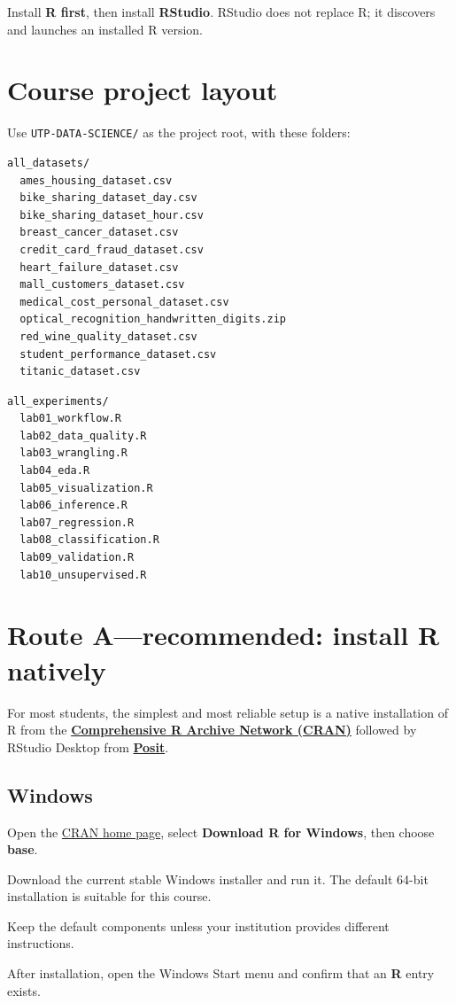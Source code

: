 \begin{keyidea}
Install \textbf{R first}, then install \textbf{RStudio}. RStudio does not replace R; it discovers and launches an installed R version.
\end{keyidea}

\section{Course project layout}
Use \texttt{UTP-DATA-SCIENCE/} as the project root, with these folders:

\noindent
\begin{minipage}[t]{0.49\linewidth}
\begin{lstlisting}[style=utpterminal]
all_datasets/
  ames_housing_dataset.csv
  bike_sharing_dataset_day.csv
  bike_sharing_dataset_hour.csv
  breast_cancer_dataset.csv
  credit_card_fraud_dataset.csv
  heart_failure_dataset.csv
  mall_customers_dataset.csv
  medical_cost_personal_dataset.csv
  optical_recognition_handwritten_digits.zip
  red_wine_quality_dataset.csv
  student_performance_dataset.csv
  titanic_dataset.csv
\end{lstlisting}
\end{minipage}\hfill
\begin{minipage}[t]{0.49\linewidth}
\begin{lstlisting}[style=utpterminal]
all_experiments/
  lab01_workflow.R
  lab02_data_quality.R
  lab03_wrangling.R
  lab04_eda.R
  lab05_visualization.R
  lab06_inference.R
  lab07_regression.R
  lab08_classification.R
  lab09_validation.R
  lab10_unsupervised.R
\end{lstlisting}
\end{minipage}

\section{Route A---recommended: install R natively}

For most students, the simplest and most reliable setup is a native installation of R from the \href{https://cran.r-project.org/}{\textbf{Comprehensive R Archive Network (CRAN)}} followed by RStudio Desktop from \href{https://posit.co/download/rstudio-desktop/}{\textbf{Posit}}.

\subsection{Windows}

\begin{utpsteps}
  \item Open the \href{https://cran.r-project.org/}{CRAN home page}, select \textbf{Download R for Windows}, then choose \textbf{base}.
  \item Download the current stable Windows installer and run it. The default 64-bit installation is suitable for this course.
  \item Keep the default components unless your institution provides different instructions.
  \item After installation, open the Windows Start menu and confirm that an \textbf{R} entry exists.
\end{utpsteps}

